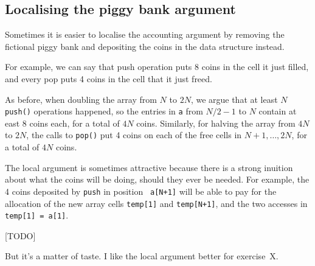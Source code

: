 \documentclass{tufte-handout}
\begin{document}
\subsection{Localising the piggy bank argument}

Sometimes it is easier to localise the accounting argument by removing
the fictional piggy bank and depositing the coins in the data
structure instead.

For example, we can say that push operation puts 8 coins in the cell
it just filled, and every pop puts 4 coins in the cell that it just
freed. 

As before, when doubling the array from $N$ to $2N$, we argue that at
least $N$ {\tt push()} operations happened, so the entries in {\tt a}
from $N/2-1$ to $N$ contain at east 8 coins each, for a total of $4N$
coins. Similarly, for halving the array from $4N$ to $2N$, the calls
to {\tt pop()} put 4 coins on each of the free cells in $N+1,\ldots,
2N$, for a total of $4N$ coins. 

The local argument is sometimes attractive because there is a strong
inuition about what the coins will be doing, should they ever be
needed.  
For example, the 4 coins deposited by {\tt push} in position {\tt
  a[N+1]} will be able to pay for the allocation of the new array
cells {\tt temp[1]} and {\tt temp[N+1]}, and the two accesses in {\tt
  temp[1] = a[1]}.

\begin{marginfigure}
  [TODO]
\end{marginfigure}

But it's a matter of taste. I like the local argument better for
exercise~X.
\end{document}
